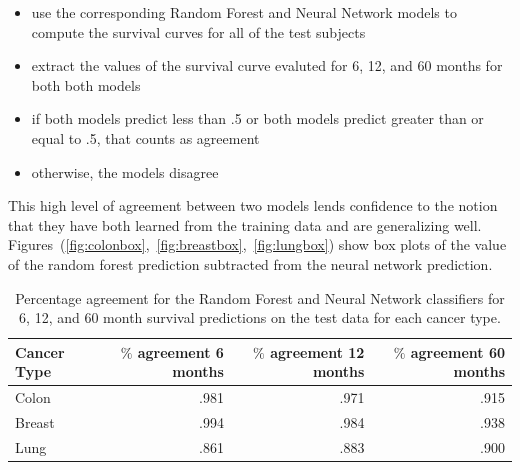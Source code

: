 \documentclass[a4paper,11pt]{article}
\begin{document}
\begin{itemize}[noitemsep]
\item use the corresponding Random Forest and Neural Network models to compute the survival curves for all of the test subjects
\item extract the values of the survival curve evaluted for 6, 12, and 60 months for both both models
\item if both models predict less than .5 or both models predict greater than or equal to .5, that counts as agreement
\item otherwise, the models disagree
\end{itemize}


This high level of agreement between two models lends confidence to the notion that they have both learned from the training data and are generalizing well. Figures~(\ref{fig:colonbox},~\ref{fig:breastbox},~\ref{fig:lungbox}) 
show box plots of the value of the random forest prediction subtracted from the neural network prediction.


\begin{table}[tbp]
\begin{center}
\begin{tabular}{lrrr}
\toprule
Cancer Type & $\%$ agreement 6 months & $\%$ agreement 12 months & $\%$ agreement 60 months \\ 
\midrule
Colon & .981 & .971 & .915 \\  
Breast & .994 & .984 & .938 \\  
Lung & .861 & .883 & .900 \\  
\bottomrule
\end{tabular}
\caption{\label{tab:agree} Percentage agreement for the Random Forest and Neural Network classifiers for 6, 12, and 60 month survival predictions on the test data for each cancer type.}
\end{center}
\end{table}
\end{document}
